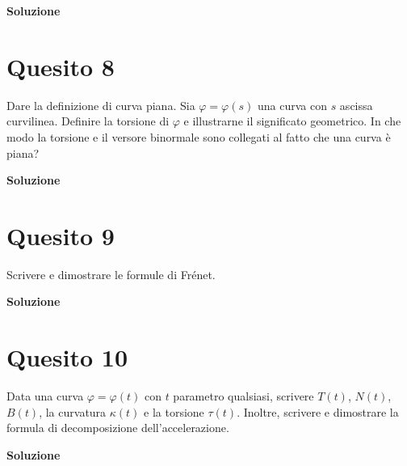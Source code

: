 \medskip
\begin{large}
\textbf{Soluzione}
\end{large}


\section*{Quesito 8}
Dare la definizione di curva piana. Sia $\varphi = \varphi(s)$ una
 curva con $s$ ascissa
curvilinea. Definire la torsione di $\varphi$ e illustrarne il 
significato geometrico. In che modo la
torsione e il versore binormale sono collegati al fatto che 
una curva è piana?

\medskip
\begin{large}
\textbf{Soluzione}
\end{large}


\section*{Quesito 9}
Scrivere e dimostrare le formule di Frénet.

\medskip
\begin{large}
\textbf{Soluzione}
\end{large}


\section*{Quesito 10}
Data una curva $\varphi = \varphi(t)$ con $t$ parametro qualsiasi, 
scrivere $T(t)$, $N(t)$, $B(t)$,
la curvatura $\kappa(t)$ e la torsione $\tau (t)$. Inoltre, 
scrivere e dimostrare la formula di decomposizione dell’accelerazione.

\medskip
\begin{large}
\textbf{Soluzione}
\end{large}
